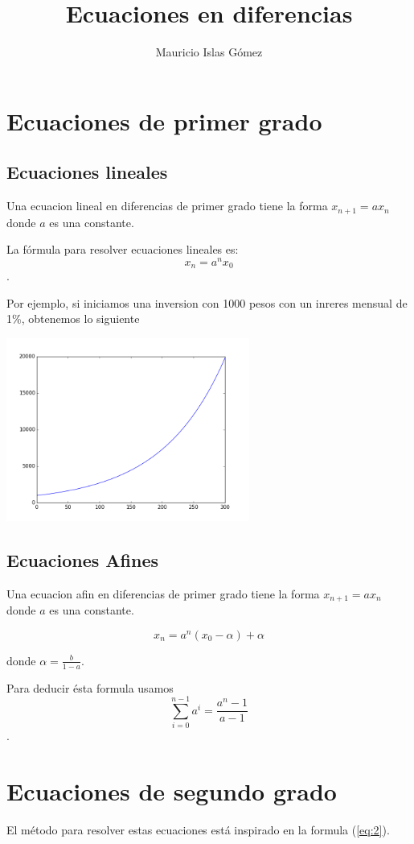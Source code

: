 \documentclass{article}
\title{Ecuaciones en diferencias}
\author{Mauricio Islas Gómez}
\begin{document}
\maketitle

\section{Ecuaciones de primer grado}

\subsection{Ecuaciones lineales}

Una ecuacion lineal en diferencias de primer grado tiene la forma $x_{n+1}=ax_{n}$ donde $a$ es una constante.

La fórmula para resolver ecuaciones lineales es:
\begin{equation}
  \label{eq:2}
  x_n=a^nx_0
\end{equation}.

Por ejemplo, si iniciamos una inversion con 1000 pesos con un inreres mensual de 1\%, obtenemos lo siguiente

\begin{center}
  \includegraphics[width=8cm]{inversion.png}
\end{center}
\subsection{Ecuaciones Afines}

Una ecuacion afin en diferencias de primer grado tiene la forma $x_{n+1}=ax_{n}$ donde $a$ es una constante.

\begin{equation}
  \label{eq:1}
  x_n=a^n(x_0-\alpha)+\alpha
\end{equation}

donde $\alpha=\frac{b}{1-a}$.

Para deducir ésta formula usamos $$\sum_{i=0}^{n-1}a^i=\frac{a^n-1}{a-1}$$.

\section{Ecuaciones de segundo grado}

El método para resolver estas ecuaciones está inspirado en la formula (\ref{eq:2}).

\end{document}
